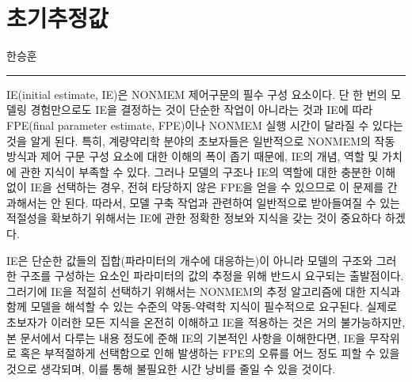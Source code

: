 \documentclass[
  11pt,
  krantz2, a4paper, twoside]{krantz}
\newenvironment{Shaded}{\begin{snugshade}}{\end{snugshade}}
\newcommand{\DataTypeTok}[1]{\textcolor[rgb]{0.13,0.29,0.53}{#1}}
\newcommand{\DecValTok}[1]{\textcolor[rgb]{0.00,0.00,0.81}{#1}}
\newcommand{\KeywordTok}[1]{\textcolor[rgb]{0.13,0.29,0.53}{\textbf{#1}}}
\newcommand{\NormalTok}[1]{#1}
\newcommand{\OtherTok}[1]{\textcolor[rgb]{0.56,0.35,0.01}{#1}}
\theoremstyle{definition}
\theoremstyle{definition}
\theoremstyle{definition}
\theoremstyle{remark}
\begin{document}
\begin{Shaded}
\end{Shaded}

\hypertarget{IE}{%
\chapter{초기추정값}\label{IE}}

\Large\hfill

한승훈
\normalsize

\begin{center}\rule{0.5\linewidth}{0.5pt}\end{center}

IE(initial estimate, IE)은 NONMEM 제어구문의 필수 구성 요소이다. 단 한 번의 모델링 경험만으로도 IE을 결정하는 것이 단순한 작업이 아니라는 것과 IE에 따라 FPE(final parameter estimate, FPE)이나 NONMEM 실행 시간이 달라질 수 있다는 것을 알게 된다. 특히, 계량약리학 분야의 초보자들은 일반적으로 NONMEM의 작동 방식과 제어 구문 구성 요소에 대한 이해의 폭이 좁기 때문에, IE의 개념, 역할 및 가치에 관한 지식이 부족할 수 있다. 그러나 모델의 구조나 IE의 역할에 대한 충분한 이해 없이 IE을 선택하는 경우, 전혀 타당하지 않은 FPE을 얻을 수 있으므로 이 문제를 간과해서는 안 된다. 따라서, 모델 구축 작업과 관련하여 일반적으로 받아들여질 수 있는 적절성을 확보하기 위해서는 IE에 관한 정확한 정보와 지식을 갖는 것이 중요하다 하겠다.

IE은 단순한 값들의 집합(파라미터의 개수에 대응하는)이 아니라 모델의 구조와 그러한 구조를 구성하는 요소인 파라미터의 값의 추정을 위해 반드시 요구되는 출발점이다. 그러기에 IE을 적절히 선택하기 위해서는 NONMEM의 추정 알고리즘에 대한 지식과 함께 모델을 해석할 수 있는 수준의 약동-약력학 지식이 필수적으로 요구된다. 실제로 초보자가 이러한 모든 지식을 온전히 이해하고 IE을 적용하는 것은 거의 불가능하지만, 본 문서에서 다루는 내용 정도에 준해 IE의 기본적인 사항을 이해한다면, IE을 무작위로 혹은 부적절하게 선택함으로 인해 발생하는 FPE의 오류를 어느 정도 피할 수 있을 것으로 생각되며, 이를 통해 불필요한 시간 낭비를 줄일 수 있을 것이다.
\end{document}
